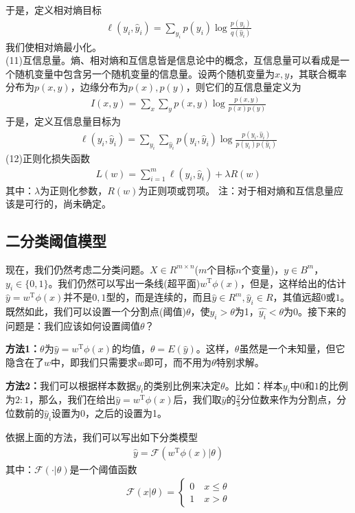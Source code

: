         于是，定义相对熵目标
        \begin{align*}
        \ell(y_i,\hat{y}_i) = \sum_{y_i}p(y_i)\log \frac{p(y_i)}{q(\hat{y}_i)}
        \end{align*}
        我们使相对熵最小化。\\
        (11)互信息量。熵、相对熵和互信息皆是信息论中的概念，互信息量可以看成是一个随机变量中包含另一个随机变量的信息量。设两个随机变量为$x,y$，其联合概率分布为$p(x,y)$，边缘分布为$p(x),p(y)$，则它们的互信息量定义为
        \begin{align*}
        I(x,y) = \sum_x\sum_yp(x,y)\log \frac{p(x,y)}{p(x)p(y)}
        \end{align*}
        于是，定义互信息量目标为
        \begin{align*}
        \ell(y_i,\hat{y}_i) = \sum_{y_i}\sum_{\hat{y}_i}p(y_i,\hat{y}_i)\log \frac{p(y_i,\hat{y}_i)}{p(y_i)p(\hat{y}_i)}
        \end{align*}
        (12)正则化损失函数
        \begin{align*}
        L(w) = \sum_{i=1}^m\ell(y_i,\hat{y}_i)+ \lambda R(w)
        \end{align*}
        其中：$\lambda$为正则化参数，$R(w)$为正则项或罚项。
        注：对于相对熵和互信息量应该是可行的，尚未确定。


    \subsection{二分类阈值模型}
        \par
        现在，我们仍然考虑二分类问题。$X \in R^{m\times n}$($m$个目标$n$个变量)，$y \in B^m$，$y_i\in \{0,1\}$。我们仍然可以写出一条线(超平面)$w^\mathrm{T}\phi(x)$，但是，这样给出的估计$\hat{y} = w^\mathrm{T}\phi(x)$并不是$0,1$型的，而是连续的，而且$\hat{y}\in R^m,\hat{y}_i \in R$，其值远超$0$或$1$。既然如此，我们可以设置一个分割点(阈值)$\theta$，使$\hat{y_i}>\theta$为1，$\hat{y_i}<\theta$为0。接下来的问题是：我们应该如何设置阈值$\theta$？
        \par
        \textbf{方法1：}$\theta$为$\hat{y} = w^\mathrm{T}\phi(x)$的均值，$\theta = E(\hat{y})$。这样，$\theta$虽然是一个未知量，但它隐含在了$w$中，即我们只需要求$w$即可，而不用为$\theta$特别求解。
        \par
        \textbf{方法2：}我们可以根据样本数据$y_i$的类别比例来决定$\theta$。比如：样本$y_i$中$0$和$1$的比例为$2:1$，那么，我们在给出$\hat{y} = w^\mathrm{T}\phi(x)$后，我们取$\hat{y}$的$\frac{2}{3}$分位数来作为分割点，分位数前的$\hat{y}_i$设置为0，之后的设置为1。
        \par
        依据上面的方法，我们可以写出如下分类模型
        \begin{align*}
        \hat{y} = \mathcal{F}(w^\mathrm{T}\phi(x)|\theta)
        \end{align*}
        其中：$\mathcal{F}(\cdot|\theta)$是一个阈值函数
        \begin{align*}
        \mathcal{F}(x|\theta) =
        \left\{
        \begin{aligned}
        0\quad x \leqslant \theta\\
        1\quad x >\theta
        \end{aligned}
        \right.
        \end{align*}
